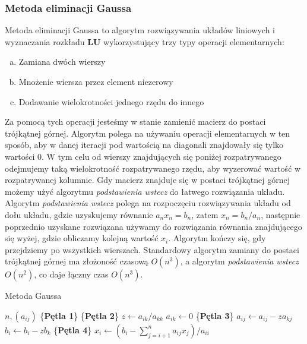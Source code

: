 \documentclass[12pt]{article}
\begin{document}
\subsubsection*{Metoda eliminacji Gaussa}
Metoda eliminacji Gaussa to algorytm rozwiązywania układów liniowych i wyznaczania rozkładu \textbf{LU} wykorzystujący trzy typy operacji elementarnych:
\begin{enumerate}[(a)]
	\item Zamiana dwóch wierszy
	\item Mnożenie wiersza przez element niezerowy
	\item Dodawanie wielokrotności jednego rzędu do innego
\end{enumerate}
Za pomocą tych operacji jesteśmy w stanie zamienić macierz do postaci trójkątnej górnej. Algorytm polega na używaniu operacji elementarnych w ten sposób, aby w danej iteracji pod wartością na diagonali znajdowały się tylko wartości 0. W tym celu od wierszy znajdujących się poniżej rozpatrywanego odejmujemy taką wielokrotność rozpatrywanego rzędu, aby wyzerować wartość w rozpatrywanej kolumnie. Gdy macierz znajduje się w postaci trójkątnej górnej możemy użyć algorytmu \textit{podstawienia wstecz} do łatwego rozwiązania układu. Algorytm \textit{podstawienia wstecz} polega na rozpoczęciu rozwiązywania układu od dołu układu, gdzie uzyskujemy równanie $a_n x_n = b_n$, zatem $x_n = b_n/a_n$, następnie poprzednio uzyskane rozwiązana używamy do rozwiązania równania znajdującego się wyżej, gdzie obliczamy kolejną wartość $x_i$. Algorytm kończy się, gdy przejdziemy po wszystkich wierszach.
Standardowy algorytm zamiany do postaci trójkątnej górnej ma złożoność czasową $O(n^3)$, a algorytm \textit{podstawienia wstecz} $O(n^2)$, co daje łączny czas $O(n^3)$.

\begin{algorithm} %
\caption{Metoda Gaussa}
\label{alg1} %
\begin{algorithmic} %
    \REQUIRE $n, (a_{ij})$
    \STATE \{\textbf{Pętla 1}\}
    		\STATE \{\textbf{Pętla 2}\}
		\STATE $z \leftarrow a_{ik}/a_{kk}$
		\STATE $a_{ik} \leftarrow 0$
    			\STATE \{\textbf{Pętla 3}\}
				\STATE $a_{ij} \leftarrow a_{ij} - z a_{kj}$
    			\ENDFOR
    			\STATE $b_i \leftarrow b_i - z b_k$
    		\ENDFOR
    \ENDFOR
    \STATE \{\textbf{Pętla 4}\}
		\STATE $x_i \leftarrow (b_i - \sum^n_{j=i+1}a_{ij}x_j)/a_{ii}$
    \ENDFOR
\end{algorithmic}
\end{algorithm}
\end{document}
